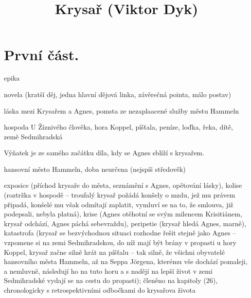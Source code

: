 \documentclass{article}
\title{\vspace{-2cm}Krysař (Viktor Dyk)\vspace{-2cm}}
\date{}
\author{}
\begin{document}
\maketitle
\section{První část.}
\begin{description}
    \setlength\itemsep{0.15em}
    \item[druh:] epika
    \item[žánr:] novela (kratší děj, jedna hlavní dějová linka, závěrečná pointa, málo postav)
    \item[téma:] láska mezi Krysařem a Agnes, pomsta ze nezaplaacené služby městu Hammeln
    \item[motivy:] hospoda U Žíznivého člověka, hora Koppel, píšťala, peníze, loďka, řeka, dítě, země Sedmihradská
    \item[zařazení výňatku do kontextu díla:] Výňatek je ze samého začátku díla, kdy se Agnes sblíží s krysařem.
    \item[časoprostor:] hansovní město Hammeln, doba neurčena (nejspíš středověk)
    \item[kompoziční výstavba:] exposice (příchod krysaře do města, seznámění s Agnes, opětování lásky), kolise (roztržka v hospodě -- troufalý krysař požádá konšely o mzdu, jež mu právem připadá, konšelé mu však odmítají zaplatit, vymluví se na to, že smlouva, již podepsali, nebyla platná), krise (Agnes otěhotní se svým milencem Krisitiánem, krysař odchází, Agnes páchá sebevraždu), peripetie (krysař hledá Agnes, marně), katastrofa (krysař se bezvýchodnou situaci rozhodne řešit stejně jako Agnes -- vzpomene si na zemi Sedmihradskou, do níž mají být brány v propasti u hory Koppel, krysař začne silně hrát na píšťalu -- tak silně, že všichni obyvatelé hansovního města Hammeln, až na Seppa Jörgena, kterému vše dochází pomaleji, a nemluvně, následují ho na tuto horu a s nadějí na lepší život v zemi Sedmihradské vydají se na cestu do propasti); členěno na kapitoly (26), chronologicky s retrospektivními odbočkami do krysařova života
\end{description}
\end{document}
